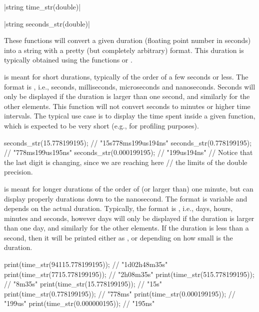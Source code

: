 \funcitem \cppinline|string time_str(double)| 

\cppinline|string seconds_str(double)| 

These functions will convert a given duration (floating point number in seconds) into a string with a pretty (but completely arbitrary) format. This duration is typically obtained using the functions  or .

 is meant for short durations, typically of the order of a few seconds or less. The format is , i.e., seconds, milliseconds, microseconds and nanoseconds. Seconds will only be displayed if the duration is larger than one second, and similarly for the other elements. This function will not convert seconds to minutes or higher time intervals. The typical use case is to display the time spent inside a given function, which is expected to be very short (e.g., for profiling purposes).

\begin{example}
\begin{cppcode}
seconds_str(15.778199195); // "15s778ms199us194ns"
seconds_str(0.778199195); // "778ms199us195ns"
seconds_str(0.000199195); // "199us194ns"
// Notice that the last digit is changing, since we are reaching here
// the limits of the double precision.
\end{cppcode}
\end{example}

 is meant for longer durations of the order of (or larger than) one minute, but can display properly durations down to the nanosecond. The format is variable and depends on the actual duration. Typically, the format is , i.e., days, hours, minutes and seconds, however days will only be displayed if the duration is larger than one day, and similarly for the other elements. If the duration is less than a second, then it will be printed either as ,  or  depending on how small is the duration.

\begin{example}
\begin{cppcode}
print(time_str(94115.778199195)); // "1d02h48m35s"
print(time_str(7715.778199195)); // "2h08m35s"
print(time_str(515.778199195)); // "8m35s"
print(time_str(15.778199195)); // "15s"
print(time_str(0.778199195)); // "778ms"
print(time_str(0.000199195)); // "199us"
print(time_str(0.000000195)); // "195ns"
\end{cppcode}
\end{example}


